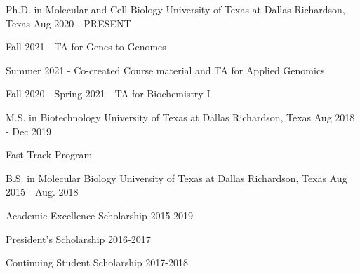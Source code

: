 

\begin{cventries}

	\cventry
	{Ph.D. in Molecular and Cell Biology} %
	{University of Texas at Dallas} %
	{Richardson, Texas} %
	{Aug 2020 - PRESENT} %
	{
		\begin{cvitems} %
			\item {Fall 2021 - TA for Genes to Genomes}
			\item {Summer 2021 - Co-created Course material and TA for Applied Genomics}
			\item {Fall 2020 - Spring 2021 - TA for Biochemistry I}
		\end{cvitems}
	}

	\cventry
	{M.S. in Biotechnology} %
	{University of Texas at Dallas} %
	{Richardson, Texas} %
	{Aug 2018 - Dec 2019} %
	{
		\begin{cvitems} %
			\item {Fast-Track Program}
		\end{cvitems}
	}

	\cventry
	{B.S. in Molecular Biology} %
	{University of Texas at Dallas} %
	{Richardson, Texas} %
	{Aug 2015 - Aug. 2018} %
	{
		\begin{cvitems} %
			\item {Academic Excellence Scholarship 2015-2019}
			\item {President's Scholarship 2016-2017}
			\item {Continuing Student Scholarship 2017-2018}
		\end{cvitems}
	}

\end{cventries}

